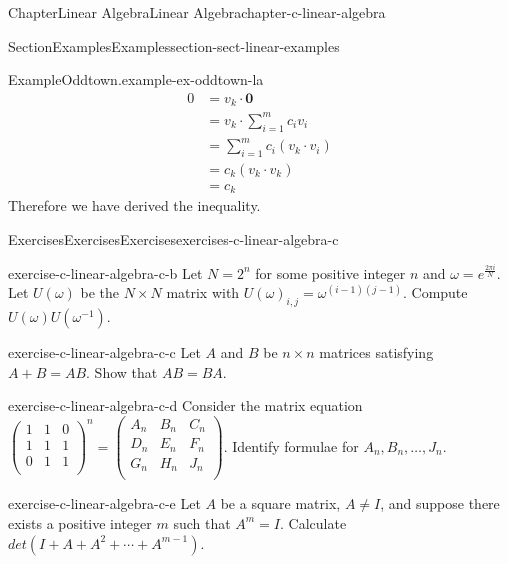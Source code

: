 \documentclass[oneside,10pt,]{book}
\numberwithin{equation}{section}
\renewcommand{\vec}[1]{\mathbf{#1}}
\begin{document}
\begin{chapterptx}{Chapter}{Linear Algebra}{}{Linear Algebra}{}{}{chapter-c-linear-algebra}
\begin{sectionptx}{Section}{Examples}{}{Examples}{}{}{section-sect-linear-examples}
\begin{example}{Example}{Oddtown.}{example-ex-oddtown-la}
\begin{equation*}
\begin{split}
0 & = v_k \cdot \vec{0}\\
& = v_k \cdot \sum_{i=1}^m c_i v_i\\
& = \sum_{i=1}^m c_i (v_k \cdot v_i)\\
& = c_k (v_k \cdot v_k)\\
& = c_k
\end{split}
\end{equation*}
Therefore we have derived the inequality.%
\end{example}
\end{sectionptx}
%
%
\typeout{************************************************}
\typeout{************************************************}
%
\begin{exercises-section}{Exercises}{Exercises}{}{Exercises}{}{}{exercises-c-linear-algebra-c}
\begin{divisionexercise}{1}{}{}{exercise-c-linear-algebra-c-b}%
Let \(N=2^n\) for some positive integer \(n\) and \(\omega =e^{\frac{2\pi i}{N}}\).  Let \(U(\omega )\) be the \(N\times N\) matrix with \(U(\omega)_{i,j}= \omega^{(i-1)(j-1)}\).  Compute \(U(\omega )U\left(\omega ^{-1}\right)\).%
\end{divisionexercise}%
\begin{divisionexercise}{2}{}{}{exercise-c-linear-algebra-c-c}%
Let \(A\) and \(B\) be \(n\times n\) matrices satisfying \(A+B = A B\). Show that \(A B = B A\).%
\end{divisionexercise}%
\begin{divisionexercise}{3}{}{}{exercise-c-linear-algebra-c-d}%
Consider the matrix equation \(\left(
\begin{array}{ccc}
1 & 1 & 0 \\
1 & 1 & 1 \\
0 & 1 & 1 \\
\end{array}
\right)^n=\left(
\begin{array}{ccc}
A_n & B_n & C_n \\
D_n & E_n & F_n \\
G_n & H_n & J_n \\
\end{array}
\right)\).  Identify formulae for \(A_n, B_n,\ldots , J_n\).%
\end{divisionexercise}%
\begin{divisionexercise}{4}{}{}{exercise-c-linear-algebra-c-e}%
Let \(A\) be a square matrix, \(A \neq I\), and suppose there exists a positive integer \(m\) such that \(A^m=I\).  Calculate \(det(I + A + A^2 + \cdots + A^{m-1})\).%

\end{divisionexercise}
\end{exercises-section}
\end{chapterptx}
\end{document}
